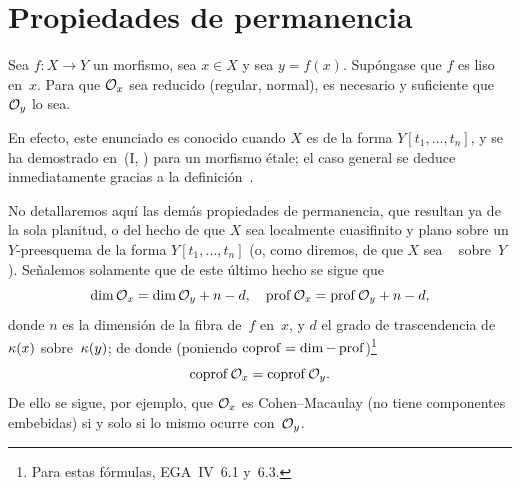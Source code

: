 \section{Propiedades de permanencia}
\label{II.3}

\begin{proposition}
\label{II.3.1}
Sea $f\colon X\to Y$ un morfismo, sea $x\in X$ y sea $y=f(x)$. Supóngase que $f$ es liso en~$x$. Para que $\cal{O}_x$ sea reducido (\resp regular, \resp normal), es necesario y suficiente que $\cal{O}_y$ lo sea.
\end{proposition}

En efecto, este enunciado es conocido cuando $X$ es de la forma $Y[t_1,\dots,t_n]$, y se ha demostrado en~(I, \no {}) para un morfismo étale; el caso general se deduce inmediatamente gracias a la definición~.

No detallaremos aquí las demás propiedades de permanencia, que resultan ya de la sola planitud, o del hecho de que $X$ sea localmente cuasifinito y plano sobre un $Y$-preesquema de la forma $Y[t_1,\dots,t_n]$ (o, como
diremos, de que $X$ sea
\ %
%
sobre~$Y$). Señalemos solamente que de este último hecho se sigue que
\begin{equation}
\label{eq:II.3.1}
{\dim\cal{O}_x=\dim\cal{O}_y+n-d,\quad
\prof\cal{O}_x=\prof\cal{O}_y+n-d},
\end{equation}
donde $n$ es la dimensión de la fibra de~$f$ en~$x$, y $d$ el grado de trascendencia de~$\kres(x)$ sobre~$\kres(y)$; de donde (poniendo $\coprof=\dim-\prof$)\footnote{Para estas fórmulas, \cf EGA~IV~6.1 y~6.3.}
\begin{equation}
\label{eq:II.3.2}
{\coprof\cal{O}_x=\coprof\cal{O}_y}.
\end{equation}
De ello se sigue, por ejemplo, que $\cal{O}_x$ es Cohen--Macaulay (\resp no tiene componentes embebidas) si y solo si lo mismo ocurre con~$\cal{O}_y$.

